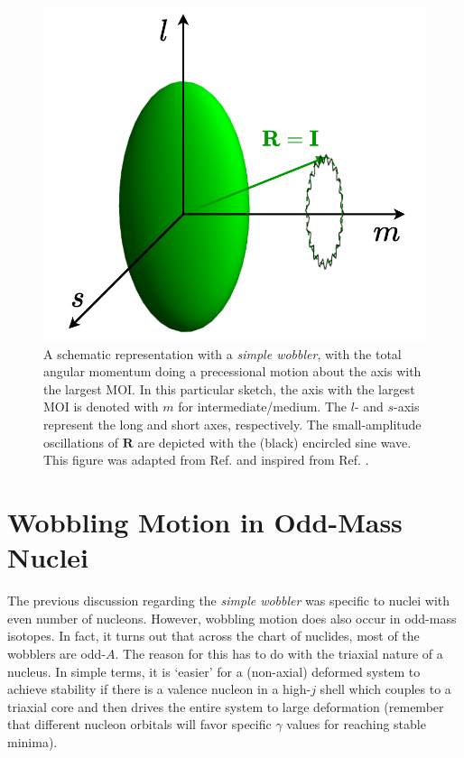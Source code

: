 \begin{figure}
    \centering
    \includegraphics[scale=0.6]{Chapters/Figures/simple_wobbler-schematic.pdf}
    \caption{A schematic representation with a \emph{simple wobbler}, with the total angular momentum doing a precessional motion about the axis with the largest MOI. In this particular sketch, the axis with the largest MOI is denoted with $m$ for intermediate/medium. The $l$- and $s$-axis represent the long and short axes, respectively. The small-amplitude oscillations of $\mathbf{R}$ are depicted with the (black) encircled sine wave. This figure was adapted from Ref. \cite{poenaru2021extensive1} and inspired from Ref. \cite{sensharma2020longitudinal}.}
    \label{simple-wobbler-geometrical-schematic}
\end{figure}

\section{Wobbling Motion in Odd-Mass Nuclei}

The previous discussion regarding the \emph{simple wobbler} was specific to nuclei with even number of nucleons. However, wobbling motion does also occur in odd-mass isotopes. In fact, it turns out that across the chart of nuclides, most of the wobblers are odd-$A$. The reason for this has to do with the triaxial nature of a nucleus. In simple terms, it is `easier' for a (non-axial) deformed system to achieve stability if there is a valence nucleon in a high-$j$ shell which couples to a triaxial core and then drives the entire system to large deformation (remember that different nucleon orbitals will favor specific $\gamma$ values for reaching stable minima).

